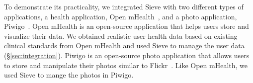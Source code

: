 To demonstrate its practicality, we integrated Sieve with
two different types of applications, a health application, 
Open mHealth~\cite{omh}, and a photo application, Piwigo~\cite{piwigo}.
Open mHealth is an open-source application that 
helps users store and visualize their data. We obtained
realistic user health data based on existing clinical standards
from Open mHealth and used Sieve 
to manage the user data (\S\ref{sec:integration}). Piwigo
is an open-source photo application that allows users to store
and manipulate their photos similar to Flickr~\cite{flickr}. 
Like Open mHealth, we used Sieve to mange the photos in Piwigo.